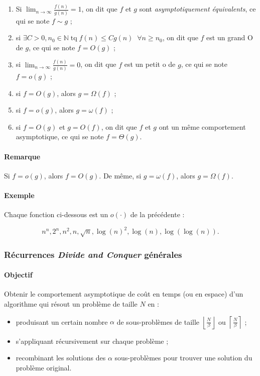\documentclass{article}
\DeclareMathOperator{\tq}{\text{ tq }}
\newcommand{\floor}[1]{{\left\lfloor#1\right\rfloor}}
\newcommand{\ceil}[1]{{\left\lceil#1\right\rceil}}
\begin{document}
			\begin{enumerate}
				\item Si $\lim_{n\to\infty}\frac {f(n)}{g(n)} = 1$, on dit que $f$ et $g$ sont \textit{asymptotiquement équivalents}, ce qui se note $f \sim g$ ;
				\item si $\exists C > 0, n_0 \in \mathbb N \tq f(n) \leq Cg(n) \;\;\forall n \geq n_0$, on dit que $f$ est un grand O de $g$, ce qui se note $f = O(g)$ ;
				\item si $\lim_{n\to\infty}\frac {f(n)}{g(n)} = 0$, on dit que $f$ est un petit o de $g$, ce qui se note $f = o(g)$ ;
				\item si $f = O(g)$, alors $g = \Omega(f)$ ;
				\item si $f = o(g)$, alors $g = \omega(f)$ ;
				\item si $f = O(g)$ et $g = O(f)$, on dit que $f$ et $g$ ont un même comportement asymptotique, ce qui se note $f = \Theta(g)$.
			\end{enumerate}

			\paragraph{Remarque} Si $f = o(g)$, alors $f = O(g)$. De même, si $g = \omega(f)$, alors $g = \Omega(f)$.

			\paragraph{Exemple} Chaque fonction ci-dessous est un $o(\cdot)$ de la précédente :

			\[n^n, 2^n, n^2, n, \sqrt n, \log(n)^2, \log(n), \log(\log(n)).\]

			\subsubsection{Récurrences \textit{Divide and Conquer} générales}

			\paragraph{Objectif} Obtenir le comportement asymptotique de coût en temps (ou en espace) d'un algorithme qui résout un problème de taille $N$ en :

			\begin{itemize}
				\item produisant un certain nombre $\alpha$ de sous-problèmes de taille $\floor{\frac N\beta}$ ou $\ceil {\frac N\beta}$ ;
				\item s'appliquant récursivement sur chaque problème ;
				\item recombinant les solutions des $\alpha$ sous-problèmes pour trouver une solution du problème original.
			\end{itemize}
\end{document}

